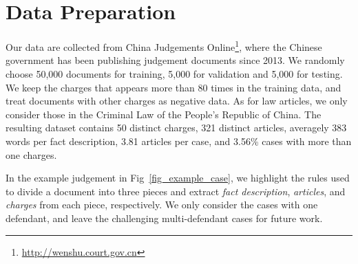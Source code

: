 \section{Data Preparation} 
Our data are collected from China Judgements Online\footnote{\url{http://wenshu.court.gov.cn}}, where the Chinese government has been publishing judgement documents since 2013.
We randomly choose 50,000 documents for training, 5,000 for validation and 5,000 for testing. We keep the charges that appears more than 80 times in the training data, and treat documents with other charges as negative data. As for law articles, we only consider those in the Criminal Law of the People's Republic of China. The resulting dataset contains 50 distinct charges, 321 distinct articles, averagely  383 words per fact description, 3.81 articles per case, and 3.56\% cases with more than one charges.

In the example judgement in Fig~\ref{fig_example_case}, we highlight the rules used to  
divide a document into three pieces %
and extract \textit{fact description}, \textit{articles}, and \textit{charges} from each piece, respectively.
We only consider the cases with one defendant, and leave the challenging multi-defendant cases for future work.





